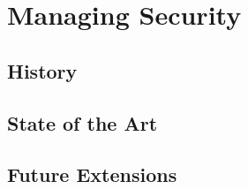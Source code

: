 \documentclass{sig-alternate}
\begin{document}


\section{Managing Security}
\label{sec:mgmt}

\subsection{History}

\subsection{State of the Art}

\subsection{Future Extensions}
\end{document}
